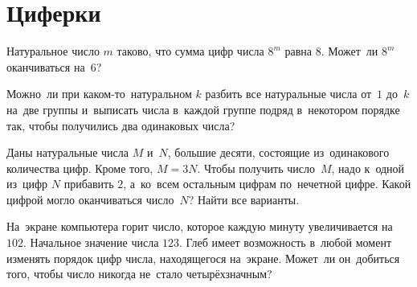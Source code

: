 
\section*{Циферки}

\begin{problems}

\item
Натуральное число $m$ таково, что сумма цифр числа $8^m$ равна $8$.
Может~ли $8^m$ оканчиваться на~$6$?

\item
Можно~ли при каком-то~натуральном $k$ разбить все натуральные числа от~$1$
до~$k$ на~две группы и~выписать числа в~каждой группе подряд в~некотором
порядке так, чтобы получились два одинаковых числа?


\item
Даны натуральные числа $M$ и~$N$, большие десяти, состоящие из~одинакового
количества цифр.
Кроме того, $M = 3 N$.
Чтобы получить число~$M$, надо к~одной из~цифр $N$ прибавить $2$, а~ко~всем
остальным цифрам по~нечетной цифре.
Какой цифрой могло оканчиваться число~$N$?
Найти все варианты.



\item
На~экране компьютера горит число, которое каждую минуту увеличивается на~$102$.
Начальное значение числа $123$.
Глеб имеет возможность в~любой момент изменять порядок цифр числа, находящегося
на~экране.
Может~ли он~добиться того, чтобы число никогда не~стало четырёхзначным?



\end{problems}
